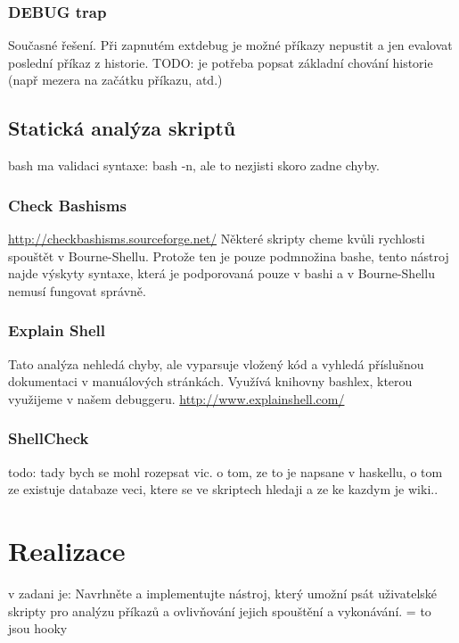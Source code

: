 \documentclass[thesis=M,czech]{FITthesis}[2012/06/26]
\begin{document}
\subsection{DEBUG trap}
Současné řešení. Při zapnutém extdebug je možné příkazy nepustit a jen evalovat poslední příkaz z historie. TODO: je potřeba popsat základní chování historie (např mezera na začátku příkazu, atd.)






\section{Statická analýza skriptů}

bash ma validaci syntaxe: bash -n, ale to nezjisti skoro zadne chyby.

\subsection{Check Bashisms}
\url{http://checkbashisms.sourceforge.net/}
Některé skripty cheme kvůli rychlosti spouštět v Bourne-Shellu. Protože ten je pouze podmnožina bashe, tento nástroj najde výskyty syntaxe, která je podporovaná pouze v bashi a v Bourne-Shellu nemusí fungovat správně.

\subsection{Explain Shell}
Tato analýza nehledá chyby, ale vyparsuje vložený kód a vyhledá příslušnou dokumentaci v manuálových stránkách. Využívá knihovny bashlex, kterou využijeme v našem debuggeru.
\url{http://www.explainshell.com/}


\subsection{ShellCheck}
todo: tady bych se mohl rozepsat vic. o tom, ze to je napsane v haskellu, o tom ze existuje databaze veci, ktere se ve skriptech hledaji a ze ke kazdym je wiki..

\chapter{Realizace}

v zadani je:
Navrhněte a implementujte nástroj, který umožní psát uživatelské skripty pro analýzu příkazů a ovlivňování jejich spouštění a vykonávání. = to jsou hooky
\end{document}
